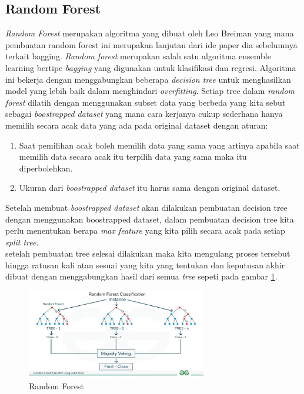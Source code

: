 \subsection{Random Forest} \label{II.randomforest}
\textit{Random Forest} merupakan algoritma yang dibuat oleh Leo Breiman  yang mana pembuatan random forest ini merupakan lanjutan dari ide paper dia sebelumnya terkait bagging\cite{breiman2001random,breiman1996bagging}.
\textit{Random forest} merupakan salah satu algoritma ensemble learning bertipe \textit{bagging} yang digunakan untuk klasifikasi dan regresi. Algoritma ini bekerja dengan menggabungkan beberapa \textit{decision tree} untuk menghasilkan model yang lebih baik dalam menghindari \textit{overfitting}\cite{breiman2001random}. Setiap tree dalam \textit{random forest} dilatih dengan menggunakan subset data yang berbeda yang kita sebut sebagai \textit{boostrapped dataset} yang mana cara kerjanya cukup sederhana hanya memilih secara acak data yang ada pada original dataset dengan aturan:
\begin{enumerate}[noitemsep]
    \item Saat pemilihan acak boleh memilih data yang sama yang artinya apabila saat memilih data secara acak itu terpilih data yang sama maka itu diperbolehkan.
    \item Ukuran dari \textit{boostrapped dataset} itu harus sama dengan original dataset.
\end{enumerate}
Setelah membuat \textit{boostrapped dataset} akan dilakukan pembuatan decision tree dengan menggunakan boostrapped dataset, dalam pembuatan decision tree kita perlu menentukan berapa \textit{max feature} yang kita pilih secara acak pada setiap \textit{split tree}.\\
setelah pembuatan tree selesai dilakukan maka kita mengulang proses tersebut hingga ratusan kali atau sesuai yang kita yang tentukan dan keputusan akhir dibuat dengan menggabungkan hasil dari semua \textit{tree} sepeti pada gambar \ref{fig:2.randomforest}.\\
\begin{figure}[H]
	\centering
	\includegraphics[width=0.7\textwidth]{figure/random_forest.png}
	\caption{Random Forest}
	\label{fig:2.randomforest}
\end{figure}
